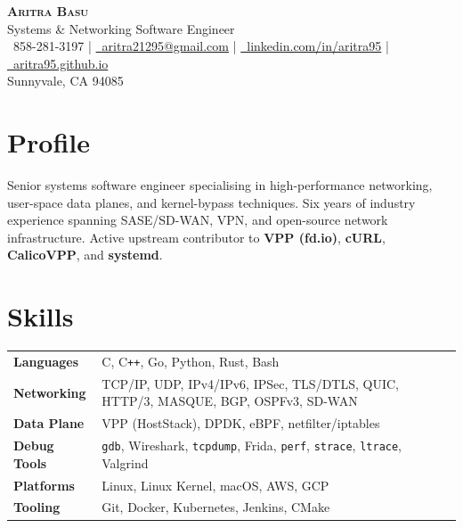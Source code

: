 \documentclass[a4paper,10pt]{article}
\begin{document}
\begin{center}
  {\Huge\bfseries\scshape Aritra Basu}\\[5pt]
  {\color{midtext} Systems \& Networking Software Engineer}\\[5pt]
  \small
  \faPhone\ 858-281-3197
  \quad\textcolor{lighttext}{|}
  \href{mailto:aritra21295@gmail.com}{\faEnvelope\ aritra21295@gmail.com}
  \quad\textcolor{lighttext}{|}
  \href{https://linkedin.com/in/aritra95/}{\faLinkedin\ linkedin.com/in/aritra95}
  \quad\textcolor{lighttext}{|}
  \href{https://linkedin.com/in/aritra95/}{\faGlobe\ aritra95.github.io}
  \\[2pt]
  \textcolor{lighttext}{\small Sunnyvale, CA 94085}
\end{center}

\vspace{2pt}

\section{Profile}

Senior systems software engineer specialising in high-performance networking, user-space data planes, and kernel-bypass techniques.
Six years of industry experience spanning SASE/SD-WAN, VPN, and open-source network infrastructure.
Active upstream contributor to \textbf{VPP (fd.io)}, \textbf{cURL}, \textbf{CalicoVPP}, and \textbf{systemd}.

\section{Skills}

\begin{tabular}{@{}ll}
  \textbf{Languages}   & C, C\texttt{++}, Go, Python, Rust, Bash \\[2pt]
  \textbf{Networking}  & TCP/IP, UDP, IPv4/IPv6, IPSec, TLS/DTLS, QUIC, HTTP/3, MASQUE, BGP, OSPFv3, SD-WAN \\[2pt]
  \textbf{Data Plane}  & VPP (HostStack), DPDK, eBPF, netfilter/iptables \\[2pt]
  \textbf{Debug Tools} & \texttt{gdb}, Wireshark, \texttt{tcpdump}, Frida, \texttt{perf}, \texttt{strace}, \texttt{ltrace}, Valgrind \\[2pt]
  \textbf{Platforms}   & Linux, Linux Kernel, macOS, AWS, GCP \\[2pt]
  \textbf{Tooling}     & Git, Docker, Kubernetes, Jenkins, CMake \\
\end{tabular}
\end{document}
